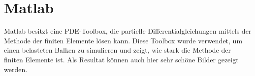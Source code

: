 %
%
%
%
\section{Matlab\label{fem:section:matlab}}

Matlab besitzt eine PDE-Toolbox, die partielle Differentialgleichungen mittels der Methode der finiten Elemente lösen kann.
Diese Toolbox wurde verwendet, um einen belasteten Balken zu simulieren und zeigt, wie stark die Methode der finiten Elemente ist.
Als Resultat können auch hier sehr schöne Bilder gezeigt werden.
